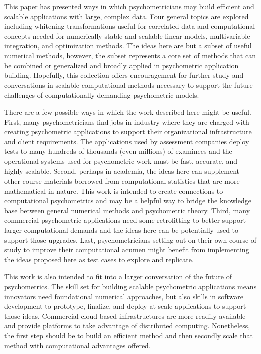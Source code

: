 \documentclass[12pt]{article}
\begin{document}
This paper has presented ways in which psychometricians may build efficient and scalable applications with large, complex data. Four general topics are explored including whitening transformations useful for correlated data and computational concepts needed for numerically stable and scalable linear models, multivariable integration, and optimization methods. The ideas here are but a subset of useful numerical methods, however, the subset represents a core set of methods that can be combined or generalized and broadly applied in psychometric application building. Hopefully, this collection offers encouragement for further study and conversations in scalable computational methods necessary to support the future challenges of computationally demanding psychometric models. 

There are a few possible ways in which the work described here might be useful. First, many psychometricians find jobs in industry where they are charged with creating psychometric applications to support their organizational infrastructure and client requirements. The applications used by assessment companies deploy tests to many hundreds of thousands (even millions) of examinees and the operational systems used for psychometric work must be fast, accurate, and highly scalable. Second, perhaps in academia, the ideas here can supplement other course materials borrowed from computational statistics that are more mathematical in nature. This work is intended to create connections to computational psychometrics and may be a helpful way to bridge the knowledge base between general numerical methods and psychometric theory. Third, many commercial psychometric applications need some retrofitting to better support larger computational demands and the ideas here can be potentially used to support those upgrades. Last, psychometricians setting out on their own course of study to improve their computational acumen might benefit from implementing the ideas proposed here as test cases to explore and replicate.

This work is also intended to fit into a larger conversation of the future of psychometrics. The skill set for building scalable psychometric applications means innovators need foundational numerical approaches, but also skills in software development to prototype, finalize, and deploy at scale applications to support those ideas. Commercial cloud-based infrastructures are more readily available and provide platforms to take advantage of distributed computing. Nonetheless, the first step should be to build an efficient method and then secondly scale that method with computational advantages offered.
\end{document}
